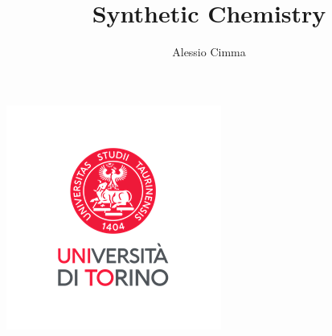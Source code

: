 \documentclass{article}
\title{Synthetic Chemistry}
\author{Alessio Cimma}
\begin{document}
\maketitle

\begin{center}
	\includegraphics*[width=0.22\linewidth]{../images/logo.png}
\end{center}

\tableofcontents
\newpage














\end{document}
